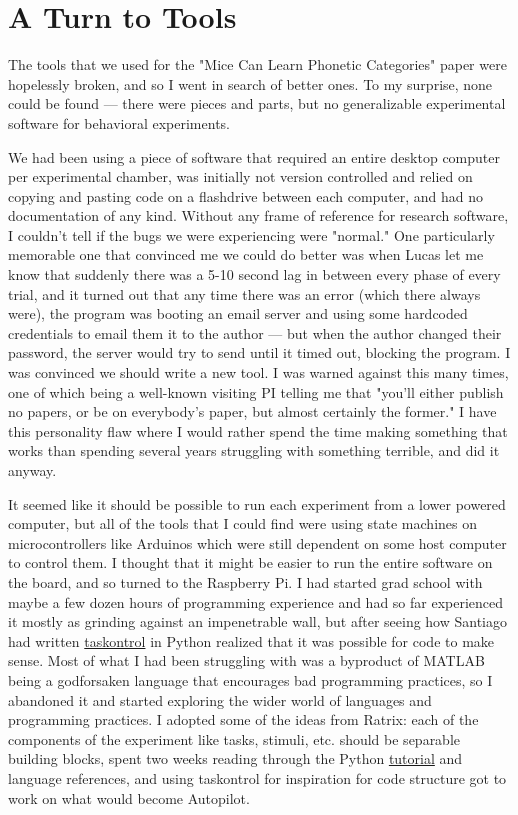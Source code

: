 \chapter*{A Turn to Tools}

The tools that we used for the "Mice Can Learn Phonetic Categories" paper were hopelessly broken, and so I went in search of better ones. To my surprise, none could be found --- there were pieces and parts, but no generalizable experimental software for behavioral experiments. 

We had been using a piece of software that required an entire desktop computer per experimental chamber, was initially not version controlled and relied on copying and pasting code on a flashdrive between each computer, and had no documentation of any kind. Without any frame of reference for research software, I couldn't tell if the bugs we were experiencing were "normal." One particularly memorable one that convinced me we could do better was when Lucas let me know that suddenly there was a 5-10 second lag in between every phase of every trial, and it turned out that any time there was an error (which there always were), the program was booting an email server and using some hardcoded credentials to email them it to the author --- but when the author changed their password, the server would try to send until it timed out, blocking the program. I was convinced we should write a new tool. I was warned against this many times, one of which being a well-known visiting PI telling me that "you'll either publish no papers, or be on everybody's paper, but almost certainly the former." I have this personality flaw where I would rather spend the time making something that works than spending several years struggling with something terrible, and did it anyway.

It seemed like it should be possible to run each experiment from a lower powered computer, but all of the tools that I could find were using state machines on microcontrollers like Arduinos which were still dependent on some host computer to control them. I thought that it might be easier to run the entire software on the board, and so turned to the Raspberry Pi. I had started grad school with maybe a few dozen hours of programming experience and had so far experienced it mostly as grinding against an impenetrable wall, but after seeing how Santiago had written \href{https://github.com/sjara/taskontrol}{taskontrol} in Python realized that it was possible for code to make sense. Most of what I had been struggling with was a byproduct of MATLAB being a godforsaken language that encourages bad programming practices, so I abandoned it and started exploring the wider world of languages and programming practices. I adopted some of the ideas from Ratrix: each of the components of the experiment like tasks, stimuli, etc. should be separable building blocks, spent two weeks reading through the Python \href{https://docs.python.org/3/tutorial/index.html}{tutorial} and language references, and using taskontrol for inspiration for code structure got to work on what would become Autopilot.

